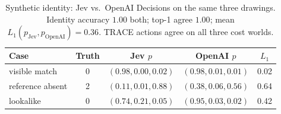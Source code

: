 \begin{table}[t]
\centering
\caption{Synthetic identity: Jev vs.\ OpenAI Decisions on the same three drawings.
Identity accuracy $1.00$ both; top-1 agree $1.00$; mean $L_1(p_{\mathrm{Jev}},p_{\mathrm{OpenAI}}){=}0.36$.
TRACE actions agree on all three cost worlds.}
\label{tab:identity}
\scriptsize
\setlength{\tabcolsep}{3pt}
\begin{tabular}{lcccc}
\toprule
Case & Truth & Jev $p$ & OpenAI $p$ & $L_1$ \\
\midrule
visible match & 0 & $(0.98,0.00,0.02)$ & $(0.98,0.01,0.01)$ & 0.02 \\
reference absent & 2 & $(0.11,0.01,0.88)$ & $(0.38,0.06,0.56)$ & 0.64 \\
lookalike & 0 & $(0.74,0.21,0.05)$ & $(0.95,0.03,0.02)$ & 0.42 \\
\bottomrule
\end{tabular}
\end{table}
